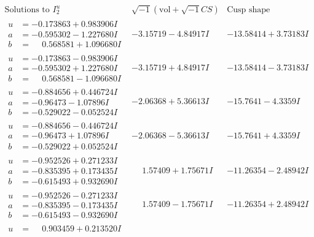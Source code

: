\documentclass[1p]{elsarticle_modified}
\theoremstyle{definition}
\newcommand{\I}{\sqrt{-1}}
\begin{document}
$$\begin{array}{c|c|c}  
\text{Solutions to }I^u_{2}& \I (\text{vol} + \sqrt{-1}CS) & \text{Cusp shape}\\
 \hline 
\begin{aligned}
u &= -0.173863 + 0.983906 I \\
a &= -0.595302 - 1.227680 I \\
b &= \phantom{-}0.568581 + 1.096680 I\end{aligned}
 & -3.15719 - 4.84917 I & -13.58414 + 3.73183 I \\ \hline\begin{aligned}
u &= -0.173863 - 0.983906 I \\
a &= -0.595302 + 1.227680 I \\
b &= \phantom{-}0.568581 - 1.096680 I\end{aligned}
 & -3.15719 + 4.84917 I & -13.58414 - 3.73183 I \\ \hline\begin{aligned}
u &= -0.884656 + 0.446724 I \\
a &= -0.96473 - 1.07896 I \\
b &= -0.529022 - 0.052524 I\end{aligned}
 & -2.06368 + 5.36613 I & -15.7641 - 4.3359 I \\ \hline\begin{aligned}
u &= -0.884656 - 0.446724 I \\
a &= -0.96473 + 1.07896 I \\
b &= -0.529022 + 0.052524 I\end{aligned}
 & -2.06368 - 5.36613 I & -15.7641 + 4.3359 I \\ \hline\begin{aligned}
u &= -0.952526 + 0.271233 I \\
a &= -0.835395 + 0.173435 I \\
b &= -0.615493 + 0.932690 I\end{aligned}
 & \phantom{-}1.57409 + 1.75671 I & -11.26354 - 2.48942 I \\ \hline\begin{aligned}
u &= -0.952526 - 0.271233 I \\
a &= -0.835395 - 0.173435 I \\
b &= -0.615493 - 0.932690 I\end{aligned}
 & \phantom{-}1.57409 - 1.75671 I & -11.26354 + 2.48942 I \\ \hline\begin{aligned}
u &= \phantom{-}0.903459 + 0.213520 I \\

\end{aligned}
\end{array}$$
\end{document}
